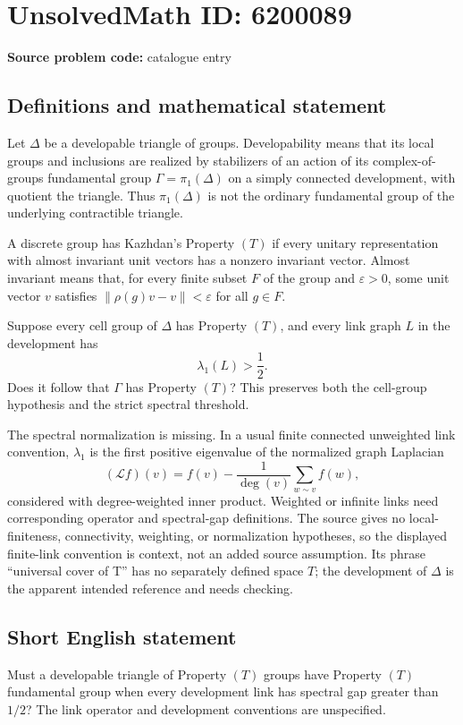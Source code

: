 \documentclass[11pt]{article}
\begin{document}
\section*{UnsolvedMath ID: 6200089}
\textbf{Source problem code:} catalogue entry
\subsection{Definitions and mathematical statement}
Let $\Delta$ be a developable triangle of groups. Developability means that its local groups and inclusions are realized by stabilizers of an action of its complex-of-groups fundamental group $\Gamma=\pi_1(\Delta)$ on a simply connected development, with quotient the triangle. Thus $\pi_1(\Delta)$ is not the ordinary fundamental group of the underlying contractible triangle.

A discrete group has Kazhdan's Property $(T)$ if every unitary representation with almost invariant unit vectors has a nonzero invariant vector. Almost invariant means that, for every finite subset $F$ of the group and $\varepsilon>0$, some unit vector $v$ satisfies $\|\rho(g)v-v\|<\varepsilon$ for all $g\in F$.

Suppose every cell group of $\Delta$ has Property $(T)$, and every link graph $L$ in the development has
\[
\lambda_1(L)>\frac12.
\]
Does it follow that $\Gamma$ has Property $(T)$? This preserves both the cell-group hypothesis and the strict spectral threshold.

The spectral normalization is missing. In a usual finite connected unweighted link convention, $\lambda_1$ is the first positive eigenvalue of the normalized graph Laplacian
\[
(\mathcal Lf)(v)=f(v)-\frac1{\deg(v)}\sum_{w\sim v}f(w),
\]
considered with degree-weighted inner product. Weighted or infinite links need corresponding operator and spectral-gap definitions. The source gives no local-finiteness, connectivity, weighting, or normalization hypotheses, so the displayed finite-link convention is context, not an added source assumption. Its phrase ``universal cover of T'' has no separately defined space $T$; the development of $\Delta$ is the apparent intended reference and needs checking.
\subsection{Short English statement}
Must a developable triangle of Property $(T)$ groups have Property $(T)$ fundamental group when every development link has spectral gap greater than $1/2$? The link operator and development conventions are unspecified.
\end{document}
